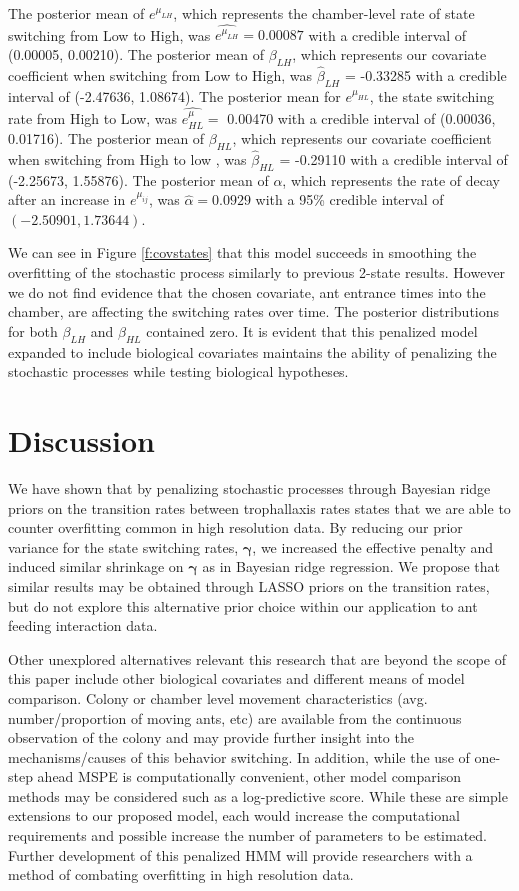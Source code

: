 \documentclass[cmbright,fleqn,referee]{envauth}
\begin{document}
The posterior mean of $e^{\mu_{LH}}$, which represents the chamber-level rate of state switching from Low to High, was $\hat{e^{\mu_{LH}}} = 0.00087$  with a credible interval of (0.00005, 0.00210). The posterior mean of $\beta_{LH}$, which represents our covariate coefficient when switching from Low to High, was $\hat{\beta}_{LH}$ = -0.33285 with a credible interval of (-2.47636, 1.08674). The posterior mean for $e^{\mu_{HL}}$, the state switching rate from High to Low, was $\hat{e^\mu_{HL}} = $ 0.00470 with a credible interval of (0.00036,	0.01716). The posterior mean of $\beta_{HL}$, which represents our covariate coefficient when switching from High to low , was $\hat{\beta}_{HL}$ = -0.29110 with a credible interval of (-2.25673, 1.55876). The posterior mean of $\alpha$, which represents the rate of decay after an increase in $e^{\mu_{ij}}$, was $\hat{\alpha} = 0.0929$ with a 95\% credible interval of $(-2.50901, 1.73644)$. 

We can see in Figure \ref{f:covstates} that  this model succeeds in smoothing the overfitting of the stochastic process similarly to previous 2-state results. However we do not find evidence that the chosen covariate, ant entrance times into the chamber, are affecting the switching rates over time. The posterior distributions for both $\beta_{LH}$ and $\beta_{HL}$ contained zero. It is evident that this penalized model expanded to include biological covariates maintains the ability of penalizing the stochastic processes while testing biological hypotheses.
% 
\section{Discussion}
\label{s:discuss}
% 
We have shown that by penalizing stochastic processes through Bayesian ridge priors on the transition rates between trophallaxis rates states that we are able to counter overfitting common in high resolution data. By reducing our prior variance for the state switching rates, $\bm{\gamma}$, we increased the effective penalty and induced similar shrinkage on $\bm{\gamma}$ as in Bayesian ridge regression. We propose that similar results may be obtained through LASSO priors on the transition rates, but do not explore this alternative prior choice within our application to ant feeding interaction data. 

Other unexplored alternatives relevant this research that are beyond the scope of this paper include other biological covariates and different means of model comparison.  Colony or chamber level movement characteristics (avg. number/proportion of moving ants, etc) are available from the continuous observation of the colony and may provide further insight into the mechanisms/causes of this behavior switching. In addition, while the use of one-step ahead MSPE is computationally convenient, other model comparison methods may be considered such as a log-predictive score. While these are simple extensions to our proposed model, each would increase the computational requirements and possible increase the number of parameters to be estimated. Further development of this penalized HMM will provide researchers with a method of combating overfitting in high resolution data.      
\end{document}
